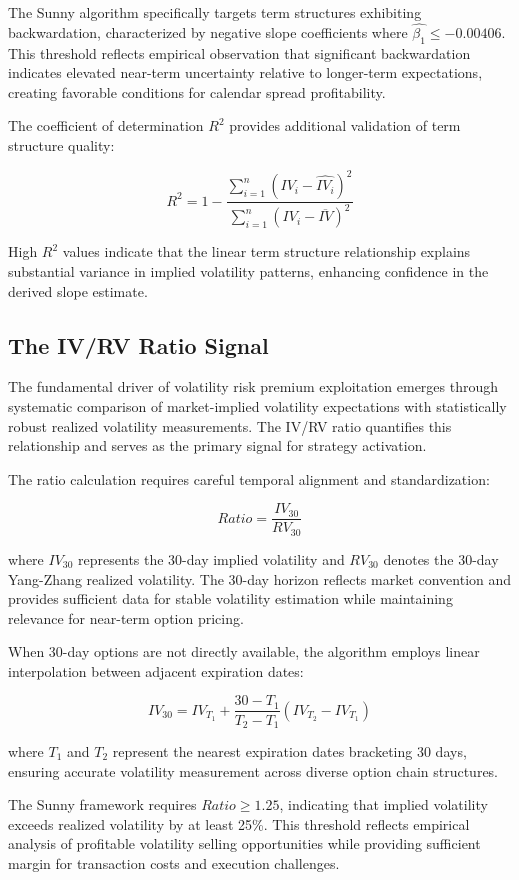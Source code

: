 \documentclass[
  american,
  11pt,
  11pt,
  letterpaper,
  onecolumn]{article}
\begin{document}
The Sunny algorithm specifically targets term structures exhibiting
backwardation, characterized by negative slope coefficients where
\(\hat{\beta_1} \leq -0.00406\). This threshold reflects empirical
observation that significant backwardation indicates elevated near-term
uncertainty relative to longer-term expectations, creating favorable
conditions for calendar spread profitability.

The coefficient of determination \(R^2\) provides additional validation
of term structure quality:

\[R^2 = 1 - \frac{\sum_{i=1}^{n}(IV_i - \hat{IV_i})^2}{\sum_{i=1}^{n}(IV_i - \overline{IV})^2}\]

High \(R^2\) values indicate that the linear term structure relationship
explains substantial variance in implied volatility patterns, enhancing
confidence in the derived slope estimate.

\subsection{The IV/RV Ratio Signal}\label{the-ivrv-ratio-signal}

The fundamental driver of volatility risk premium exploitation emerges
through systematic comparison of market-implied volatility expectations
with statistically robust realized volatility measurements. The IV/RV
ratio quantifies this relationship and serves as the primary signal for
strategy activation.

The ratio calculation requires careful temporal alignment and
standardization:

\[Ratio = \frac{IV_{30}}{RV_{30}}\]

where \(IV_{30}\) represents the 30-day implied volatility and
\(RV_{30}\) denotes the 30-day Yang-Zhang realized volatility. The
30-day horizon reflects market convention and provides sufficient data
for stable volatility estimation while maintaining relevance for
near-term option pricing.

When 30-day options are not directly available, the algorithm employs
linear interpolation between adjacent expiration dates:

\[IV_{30} = IV_{T_1} + \frac{30 - T_1}{T_2 - T_1}(IV_{T_2} - IV_{T_1})\]

where \(T_1\) and \(T_2\) represent the nearest expiration dates
bracketing 30 days, ensuring accurate volatility measurement across
diverse option chain structures.

The Sunny framework requires \(Ratio \geq 1.25\), indicating that
implied volatility exceeds realized volatility by at least 25\%. This
threshold reflects empirical analysis of profitable volatility selling
opportunities while providing sufficient margin for transaction costs
and execution challenges.
\end{document}
